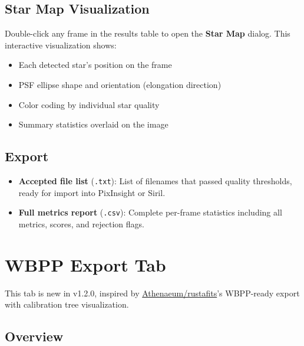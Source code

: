 \documentclass[11pt,a4paper]{article}
\begin{document}
\subsection{Star Map Visualization}

Double-click any frame in the results table to open the \textbf{Star Map} dialog. This interactive visualization shows:
\begin{itemize}
    \item Each detected star's position on the frame
    \item PSF ellipse shape and orientation (elongation direction)
    \item Color coding by individual star quality
    \item Summary statistics overlaid on the image
\end{itemize}

\subsection{Export}

\begin{itemize}
    \item \textbf{Accepted file list} (\texttt{.txt}): List of filenames that passed quality thresholds, ready for import into PixInsight or Siril.
    \item \textbf{Full metrics report} (\texttt{.csv}): Complete per-frame statistics including all metrics, scores, and rejection flags.
\end{itemize}


\section{WBPP Export Tab}
\label{sec:wbpp}

\begin{newfeaturebox}
This tab is new in v1.2.0, inspired by \href{https://github.com/eg013ra1n/rustafits}{Athenaeum/rustafits}'s WBPP-ready export with calibration tree visualization.
\end{newfeaturebox}

\subsection{Overview}
\end{document}
